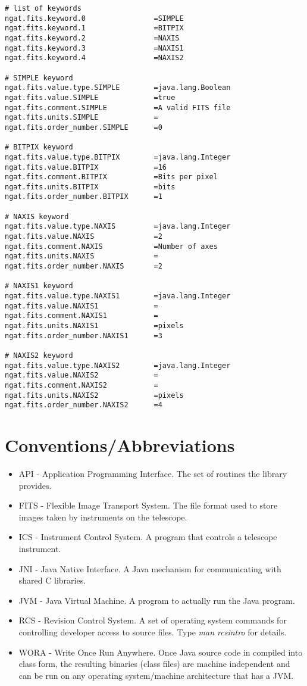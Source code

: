 \documentclass[10pt,a4paper]{article}
\begin{document}
\begin{verbatim}
# list of keywords
ngat.fits.keyword.0                =SIMPLE
ngat.fits.keyword.1                =BITPIX
ngat.fits.keyword.2                =NAXIS
ngat.fits.keyword.3                =NAXIS1
ngat.fits.keyword.4                =NAXIS2

# SIMPLE keyword
ngat.fits.value.type.SIMPLE        =java.lang.Boolean
ngat.fits.value.SIMPLE             =true
ngat.fits.comment.SIMPLE           =A valid FITS file
ngat.fits.units.SIMPLE             =
ngat.fits.order_number.SIMPLE      =0

# BITPIX keyword
ngat.fits.value.type.BITPIX        =java.lang.Integer
ngat.fits.value.BITPIX             =16
ngat.fits.comment.BITPIX           =Bits per pixel
ngat.fits.units.BITPIX             =bits
ngat.fits.order_number.BITPIX      =1

# NAXIS keyword
ngat.fits.value.type.NAXIS         =java.lang.Integer
ngat.fits.value.NAXIS              =2
ngat.fits.comment.NAXIS            =Number of axes
ngat.fits.units.NAXIS              =
ngat.fits.order_number.NAXIS       =2

# NAXIS1 keyword
ngat.fits.value.type.NAXIS1        =java.lang.Integer
ngat.fits.value.NAXIS1             =
ngat.fits.comment.NAXIS1           =
ngat.fits.units.NAXIS1             =pixels
ngat.fits.order_number.NAXIS1      =3

# NAXIS2 keyword
ngat.fits.value.type.NAXIS2        =java.lang.Integer
ngat.fits.value.NAXIS2             =
ngat.fits.comment.NAXIS2           =
ngat.fits.units.NAXIS2             =pixels
ngat.fits.order_number.NAXIS2      =4
\end{verbatim}

\section{Conventions/Abbreviations}
\begin{itemize}
\item API - Application Programming Interface. The set of routines the library provides.
\item FITS - Flexible Image Transport System. The file format used to store images taken by instruments
	on the telescope.
\item ICS - Instrument Control System. A program that controls a telescope instrument.
\item JNI - Java Native Interface. A Java mechanism for communicating with shared C libraries.
\item JVM - Java Virtual Machine. A program to actually run the Java program.
\item RCS - Revision Control System. A set of operating system commands for controlling developer access to
source files. Type {\em man rcsintro} for details.
\item WORA - Write Once Run Anywhere. Once Java source code in compiled into class form, the resulting
	binaries (class files) are machine independent and can be run on any operating 
	system/machine architecture that has a JVM.
\end{itemize}
\end{document}
